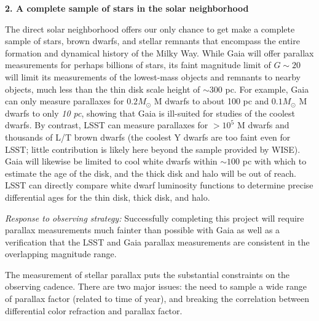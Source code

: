 {\bf 2. A complete sample of stars in the solar neighborhood}

The direct solar neighborhood offers our only chance to get make a complete sample of stars, brown dwarfs, and stellar remnants that encompass the entire formation and dynamical history of the Milky Way. While Gaia will offer parallax measurements for perhaps billions of stars, its faint magnitude limit of $G\sim 20$ will limit its measurements of the lowest-mass objects
and remnants to nearby objects, much less than the thin disk scale height of $\sim 300$ pc. For example, Gaia can only measure parallaxes for $0.2 M_{\odot}$ M dwarfs to about 100 pc
and $0.1 M_{\odot}$ M dwarfs to only \emph{10 pc}, showing that Gaia is ill-suited for studies of the coolest dwarfs. By contrast, LSST can measure parallaxes for $> 10^5$ M dwarfs and thousands of L/T brown dwarfs (the coolest Y dwarfs are too faint even for LSST; little contribution is likely here beyond the sample provided by WISE). Gaia will likewise be limited to cool white dwarfs within $\sim 100$ pc with which to estimate the age of the disk, and the thick disk and halo will be out of reach. LSST can directly compare white dwarf luminosity functions to determine precise differential ages for the thin disk, thick disk, and halo.

{\it Response to observing strategy:} Successfully completing this project will require parallax measurements much fainter than possible with Gaia as well as a verification that the LSST and Gaia parallax measurements are consistent in the overlapping magnitude range.

The measurement of stellar parallax puts the substantial constraints on the observing cadence. There are two major issues: the need to sample a wide range of parallax factor (related to time of year), and breaking the correlation between differential color refraction and parallax factor.

